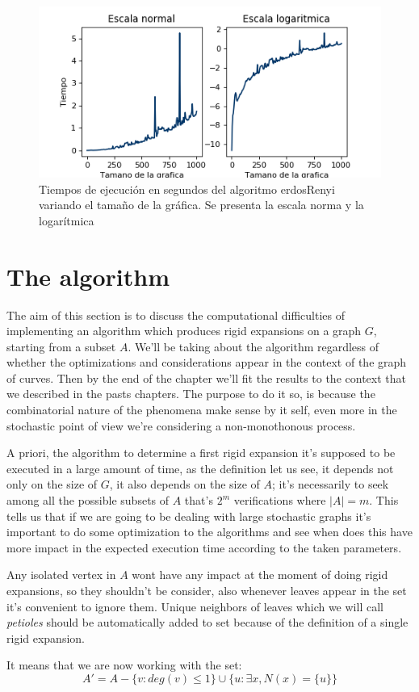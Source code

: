 \begin{figure}[h!]
	\centering
	\includegraphics[scale=0.8]{Python/Figures/Times-ER.png}
	\caption{Tiempos de ejecución en segundos del algoritmo erdosRenyi variando el tamaño de la gráfica. Se presenta la escala norma y la logarítmica}
	\label{fig:tiemposER}
\end{figure}



\section{The algorithm}
The aim of this section is to discuss the computational difficulties of implementing an algorithm which produces rigid expansions on a graph $G$, starting from a subset $A$. We'll be taking about the algorithm regardless of whether the optimizations and considerations appear in the context of the graph of curves. Then by the end of the chapter we'll fit the results to the context that we described in the pasts chapters. The purpose to do it so, is because the combinatorial nature of the phenomena make sense by it self, even more in the stochastic point of view we're considering a non-monothonous process.

A priori, the algorithm to determine a first rigid expansion it's supposed to be executed in a large amount of time, as the definition let us see, it depends not only on the size of $G$, it also depends on the size of $A$; it's necessarily to seek among all the possible subsets of $A$ that's $2^{m}$ verifications where $|A| = m$. This tells us that if we are going to be dealing with large stochastic graphs it's important to do some optimization to the algorithms and see when does this have more impact in the expected execution time according to the taken parameters.

Any isolated vertex in $A$ wont have any impact at the moment of doing rigid expansions, so they shouldn't be consider, also whenever leaves appear in the set it's convenient to ignore them. Unique neighbors of leaves which we will call \textit{petioles} should be automatically added to set because of the definition of a single rigid expansion.

It means that we are now working with the set:
$$A' = A - \{v: deg(v)\leq 1 \} \cup \{u: \exists x, N(x)=\{u\}\} $$

